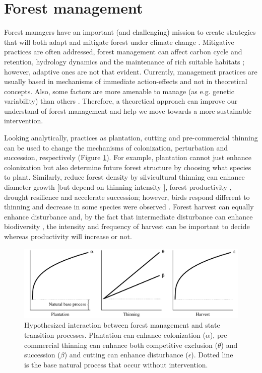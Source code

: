 \section{Forest management}

Forest managers have an important (and challenging) mission to create strategies that will both adapt and mitigate forest under climate change \parencite{Millar2007}.
Mitigative practices are often addressed, forest management can affect carbon cycle and retention, hydrology dynamics and the maintenance of rich suitable habitats \parencite{Becknell2015}; however, adaptive ones are not that evident.
Currently, management practices are usually based in mechanisms of immediate action-effects and not in theoretical concepts.
Also, some factors are more amenable to manage (as e.g. genetic variability) than others \parencite[e.g. individual sensitivity, presence of alternative stable states;][]{Oliver2015}.
Therefore, a theoretical approach can improve our understand of forest management and help we move towards a more sustainable intervention.

Looking analytically, practices as plantation, cutting and pre-commercial thinning can be used to change the mechanisms of colonization, perturbation and succession, respectively (Figure \ref{fig:fig2}).
For example, plantation cannot just enhance colonization but also determine future forest structure by choosing what species to plant.
Similarly, reduce forest density by silvicultural thinning can enhance diameter growth \parencite{Rytter2014} [but depend on thinning intensity \parencite{Olivar2014,Fuller2013}], forest productivity \parencite{Chase2016a}, drought resilience \parencite{Bottero2017,Sohn2013} and accelerate succession; however, birds respond different to thinning and decrease in some species were observed \parencite{Hayes2003}.
Forest harvest can equally enhance disturbance and, by the fact that intermediate disturbance can enhance biodiversity \parencite{Grime1973,Horn1975,Connell1978}, the intensity and frequency of harvest can be important to decide whereas productivity will increase or not.

\begin{figure}
    \centering
    \includegraphics[width=1\textwidth]{img/fig2.pdf}
    \caption{Hypothesized interaction between forest management and state transition processes. Plantation can enhance colonization ($\alpha$), pre-commercial thinning can enhance both competitive exclusion ($\theta$) and succession ($\beta$) and cutting can enhance disturbance ($\epsilon$). Dotted line is the base natural process that occur without intervention.}
    \label{fig:fig2}
\end{figure}

